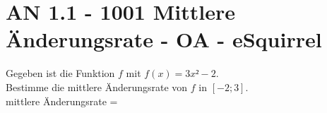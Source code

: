 \section{AN 1.1 - 1001 Mittlere Änderungsrate - OA - eSquirrel}

\begin{beispiel}[AN 1.1]{1} %
Gegeben ist die Funktion $f$ mit $f(x)=3x²-2$.\\
Bestimme die mittlere Änderungsrate von $f$ in $\left[-2;3\right]$.\\

mittlere Änderungsrate = 
\end{beispiel}